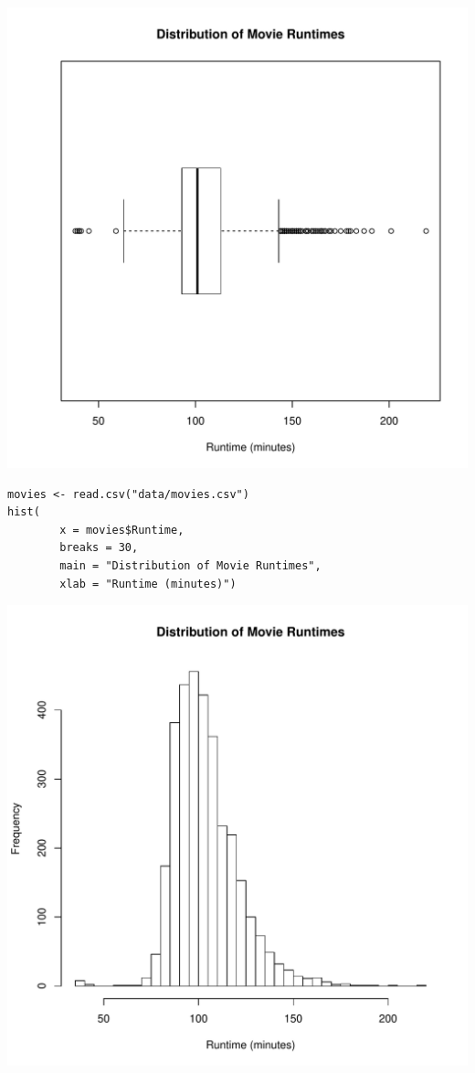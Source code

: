 \documentclass[a4paper, captions=tableheading]{tufte-book}
\begin{document}
\includegraphics[width=.9\linewidth]{img/1-num-base-02.pdf}

\begin{verbatim}
movies <- read.csv("data/movies.csv")
hist(
		x = movies$Runtime,
		breaks = 30,
		main = "Distribution of Movie Runtimes",
		xlab = "Runtime (minutes)")
\end{verbatim}

\includegraphics[width=.9\linewidth]{img/1-num-base-03.pdf}
\end{document}
